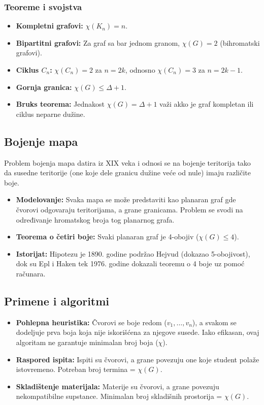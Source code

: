 \documentclass[a4paper,12pt,twoside]{report}
\numberwithin{algorithm}{section}
\begin{document}
\subsubsection{Teoreme i svojstva}
\begin{itemize}
    \item \textbf{Kompletni grafovi:} $\chi(K_n) = n$.
    \item \textbf{Bipartitni grafovi:} Za graf sa bar jednom granom, $\chi(G) = 2$ (bihromatski grafovi).
    \item \textbf{Ciklus $C_n$:} $\chi(C_n) = 2$ za $n=2k$, odnosno $\chi(C_n) = 3$ za $n=2k-1$.
    \item \textbf{Gornja granica:} $\chi(G) \leq \Delta + 1$.
    \item \textbf{Bruks teorema:} Jednakost $\chi(G) = \Delta + 1$ važi akko je graf kompletan ili ciklus neparne dužine.
\end{itemize}

\subsection{Bojenje mapa}
Problem bojenja mapa datira iz XIX veka i odnosi se na bojenje teritorija tako da susedne teritorije (one koje dele granicu dužine veće od nule) imaju različite boje.

\begin{itemize}
    \item \textbf{Modelovanje:} Svaka mapa se može predstaviti kao planaran graf gde čvorovi odgovaraju teritorijama, a grane granicama. Problem se svodi na određivanje hromatskog broja tog planarnog grafa.
    \item \textbf{Teorema o četiri boje:} Svaki planaran graf je 4-obojiv ($\chi(G) \leq 4$).
    \item \textbf{Istorijat:} Hipotezu je 1890. godine podržao Hejvud (dokazao 5-obojivost), dok su Epl i Haken tek 1976. godine dokazali teoremu o 4 boje uz pomoć računara.
\end{itemize}


\subsection*{Primene i algoritmi}
\begin{itemize}
    \item \textbf{Pohlepna heuristika:} Čvorovi se boje redom ($v_1, \dots, v_n$), a svakom se dodeljuje prva boja koja nije iskorišćena za njegove susede. Iako efikasan, ovaj algoritam ne garantuje minimalan broj boja ($\chi$).
    \item \textbf{Raspored ispita:} Ispiti su čvorovi, a grane povezuju one koje student polaže istovremeno. Potreban broj termina = $\chi(G)$.
    \item \textbf{Skladištenje materijala:} Materije su čvorovi, a grane povezuju nekompatibilne supstance. Minimalan broj skladišnih prostorija = $\chi(G)$.
\end{itemize}
\end{document}
